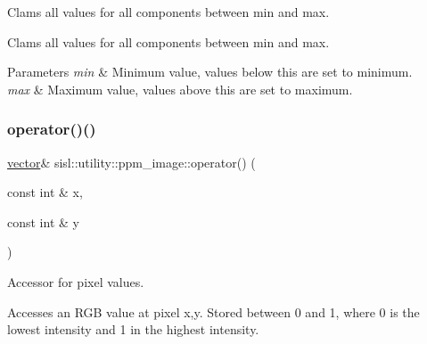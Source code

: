 Clams all values for all components between min and max. 

Clams all values for all components between min and max. 
\begin{DoxyParams}{Parameters}
{\em min} & Minimum value, values below this are set to minimum. \\
\hline
{\em max} & Maximum value, values above this are set to maximum. \\
\hline
\end{DoxyParams}
\mbox{\label{classsisl_1_1utility_1_1ppm__image_ad2ec02b1fcc76fbaa3d4df71200e0521}} 
\subsubsection{\texorpdfstring{operator()()}{operator()()}}
{\footnotesize\ttfamily \hyperlink{namespacesisl_a2069bd5374a9be042ff3ce3306d41e1a}{vector}\& sisl\+::utility\+::ppm\+\_\+image\+::operator() (\begin{DoxyParamCaption}\item[{const int \&}]{x,  }\item[{const int \&}]{y }\end{DoxyParamCaption})\hspace{0.3cm}{\ttfamily [inline]}}



Accessor for pixel values. 

Accesses an R\+GB value at pixel x,y. Stored between 0 and 1, where 0 is the lowest intensity and 1 in the highest intensity. \mbox{\label{classsisl_1_1utility_1_1ppm__image_a7e3ae9169fecfcd95dc8352fa4ca1c12}} 
